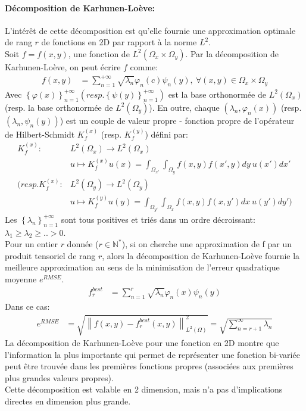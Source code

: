 \paragraph{Décomposition de Karhunen-Loève:\\}
\hspace{0.5cm} L'intérêt de cette décomposition est qu'elle fournie une approximation optimale de rang $r$ de fonctions en 2D par rapport à la norme $L^2$.\\
Soit $f=f(x,y)$, une fonction de $L^2(\Omega_x \times \Omega_y)$. Par la décomposition de Karhunen-Loève, on peut écrire $f$ comme:
\begin{align}
		f(x,y) &= \sum_{n=1}^{+\infty} \sqrt{\lambda_n} \varphi_n(c)\psi_n(y),\ \forall(x,y) \in\Omega_x \times \Omega_y \nonumber
\end{align}
Avec $\left \{ \varphi(x) \right \}_{n=1}^{+\infty} (resp. \left \{ \psi(y) \right \}_{n=1}^{+\infty})$ est la base orthonormée de $L^2(\Omega_x)$ (resp. la base orthonormée de $L^2(\Omega_y)$).
En outre, chaque $(\lambda_n,\varphi_n(x))$ (resp. $(\lambda_n,\psi_n(y))$) est un couple de valeur propre - fonction propre de l'opérateur de Hilbert-Schmidt $K_f^{(x)}$ (resp. $K_f^{(y)}$)
défini par:
\begin{align}
						K_f^{(x)} :	& L^2(\Omega_x) \rightarrow L^2(\Omega_x) \nonumber \\
												&	u \mapsto K_f^{(x)} u(x) = \int_{\Omega_{x'}} \int_{\Omega_{y}} f(x,y) f(x',y)dy\ u(x')dx' \nonumber \\
		(resp. K_f^{(x)} :	& L^2(\Omega_y) \rightarrow L^2(\Omega_y) \nonumber \\
												&	u \mapsto K_f^{(y)} u(y) = \int_{\Omega_{y'}} \int_{\Omega_{x}} f(x,y) f(x,y')dx\ u(y')dy' ) \nonumber
\end{align}
Les $\left \{\lambda_n \right \}_{n=1}^{+\infty}$ sont tous positives et triés dans un ordre décroissant: $\lambda_1 \geq \lambda_2 \geq .. > 0$.\\
Pour un entier $r$ donnée ($r\in\mathbb{N}^{*}$), si on cherche une approximation de f par un produit tensoriel de rang $r$, alors la décomposition de Karhunen-Loève fournie la meilleure approximation au sens de la minimisation de l'erreur quadratique moyenne $e^{RMSE}$.
\begin{align}
		f_r^{best} & = \sum_{n=1}^r \sqrt{\lambda_n} \varphi_n(x) \psi_n(y)  \nonumber
\end{align}
Dans ce cas:
\begin{align}
		e^{RMSE} &= \sqrt{ \left \| f(x,y) - f_r^{best}(x,y) \right \|_{L^2(\Omega)}^2} = \sqrt{\sum_{n=r+1}^{\infty} \lambda_n} \nonumber
\end{align}
La décomposition de Karhunen-Loève pour une fonction en 2D montre que l'information la plus importante qui permet de représenter une fonction bi-variée peut être trouvée dans les premières fonctions propres (associées aux premières plus grandes valeurs propres). \\
Cette décomposition est valable en 2 dimension, mais n'a pas d'implications directes en dimension plus grande.

